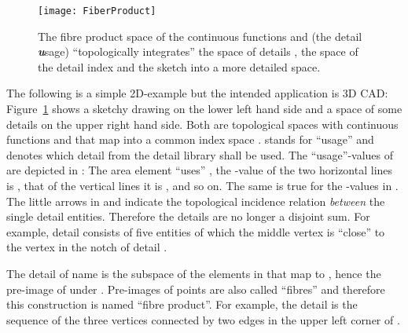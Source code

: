 \documentclass[5p]{elsarticle}
\newcommand{\qq}[1]{``#1''}
\begin{document}
\begin{figure}[t]
\begin{center}
\texttt{[image: FiberProduct]}
\end{center}
\caption{The fibre product space  of the continuous functions  and 
 (the detail \textbf{\textit{u}}sage) \qq{topologically integrates} the space of 
details , the space of the detail index  and the sketch  into a more detailed space.}
\label{fig:FiberProduct}
\end{figure}

The following is a simple 2D-example but the intended application is 3D CAD:
Figure~\ref{fig:FiberProduct} shows a sketchy drawing  on the lower left hand side and a 
space of some details  on the upper right hand side. Both are topological spaces with 
continuous functions  and  that map into a common index space . 
 stands for \qq{usage} and denotes which detail from the detail library  shall be 
used. 
The \qq{usage}-values of  are depicted in : The area element \qq{uses} , the -value 
of the two horizontal lines is , that of the vertical lines it is , and so on. 
The same is true for the -values in . 
The little arrows in  and  indicate the topological incidence relation \emph{between} 
the single detail entities. Therefore the details are no longer a disjoint sum.  
For example, detail  consists of five entities of which the middle vertex 
is \qq{close} to the vertex in the notch of detail . 


The detail of name  is the subspace of the elements in  that map to 
, hence the pre-image  of  under . 
Pre-images of points are also called \qq{fibres} and therefore this construction is named 
\qq{fibre product}. For example, the detail  is the sequence of the three vertices 
connected by two edges in the upper left corner of . 
\end{document}
